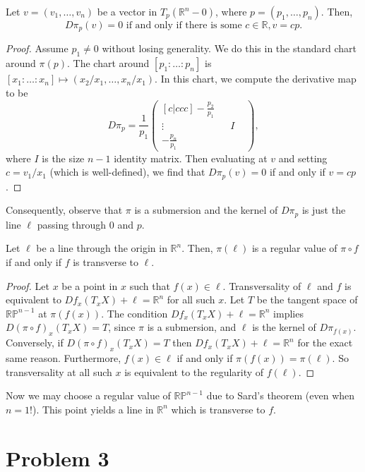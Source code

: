 \documentclass{amsbook}
\theoremstyle{theorem}
\theoremstyle{plain}
\theoremstyle{remark}
\newcommand{\R}{\mathbb R}
\renewcommand{\P}{\mathbb P}
\begin{document}
\begin{lemma}
  Let $v = (v_1,\dots, v_n)$ be a vector in $T_p(\R^n - 0)$, where $p = (p_1, \dots, p_n)$. Then, \[D\pi_p(v) = 0 \text{ if and only if there is some } c \in \R, v = cp.\]
\end{lemma}
\begin{proof}
  Assume $p_1 \neq 0$ without losing generality. We do this in the standard chart around $\pi(p)$. The chart around $[p_1:\dots:p_n]$ is $[x_1:\dots:x_n] \mapsto (x_2/x_1, \dots, x_n/x_1)$. In this chart, we compute the derivative map to be \[D\pi_p =
    \frac{1}{p_1}\begin{pmatrix}[c|ccc]
                   -\tfrac{p_2}{p_1} & &&\\
                   \vdots &  & I &\\
                   -\tfrac{p_n}{p_1}&&&
    \end{pmatrix},\] where $I$ is the size $n-1$ identity matrix. Then evaluating at $v$ and setting $c = v_1/x_1$ (which is well-defined), we find that $D\pi_p(v) = 0$ if and only if $v = cp$.
\end{proof}
Consequently, observe that $\pi$ is a submersion and the kernel of $D\pi_p$ is just the line $\ell$ passing through $0$ and $p$. 
\begin{lemma}
  Let $\ell$ be a line through the origin in $\R^n$. Then, $\pi(\ell)$ is a regular value of $\pi\circ f$ if and only if $f$ is transverse to $\ell$. 
\end{lemma}
\begin{proof}
  Let $x$ be a point in $x$ such that $f(x) \in \ell$. Transversality of $\ell$ and $f$ is equivalent to $Df_x(T_xX) + \ell = \R^n$ for all such $x$. Let $T$ be the tangent space of $\R\P^{n-1}$ at $\pi(f(x))$. The condition $Df_x(T_xX) + \ell = \R^n$ implies $D(\pi\circ f)_x(T_xX) = T$, since $\pi$ is a submersion, and $\ell$ is the kernel of $D\pi_{f(x)}$. Conversely, if $D(\pi\circ f)_x(T_xX) = T$ then $Df_x(T_xX) + \ell = \R^n$ for the exact same reason. Furthermore, $f(x) \in \ell$ if and only if $\pi(f(x)) = \pi(\ell)$. So transversality at all such $x$ is equivalent to the regularity of $f(\ell)$. 
\end{proof}

Now we may choose a regular value of $\R\P^{n-1}$ due to Sard's theorem (even when $n = 1$!). This point yields a line in $\R^n$ which is transverse to $f$.
\chapter*{Problem 3}
\end{document}
